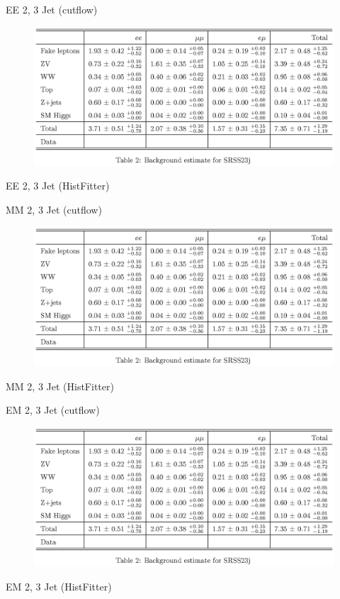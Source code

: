 \documentclass[14pt,a4paper]{atlasnote}
\begin{document}
\newpage
\vfill
\center
EE 2, 3 Jet (cutflow)
\begin{figure}[H]
\includegraphics{figures/WHSS23j.eps}
\end{figure}
EE 2, 3 Jet (HistFitter)

\vfill
\clearpage

\newpage
\vfill
\center
MM 2, 3 Jet (cutflow)
\begin{figure}[H]
\includegraphics{figures/WHSS23j.eps}
\end{figure}
MM 2, 3 Jet (HistFitter)

\vfill
\clearpage

\newpage
\vfill
\center
EM 2, 3 Jet (cutflow)
\begin{figure}[H]
\includegraphics{figures/WHSS23j.eps}
\end{figure}
EM 2, 3 Jet (HistFitter)

\vfill
\clearpage
\end{document}
